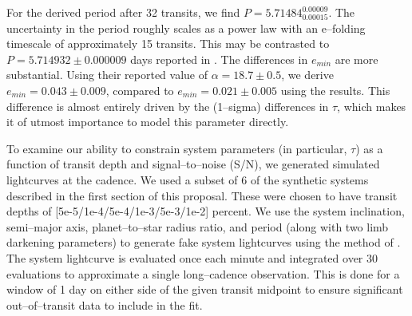For the derived period after 32 transits, we find $P =
5.71484_{0.00015}^{0.00009}$.  The uncertainty in the period roughly
scales as a power law with an e--folding timescale of approximately 15
transits.  This may be contrasted to $P = 5.714932 \pm 0.000009$ days
reported in \cite{2013arXiv1304.7387B}.  The differences in $e_{min}$
are more substantial.  Using their reported value of $\alpha =
18.7 \pm 0.5$, we derive $e_{min} = 0.043 \pm 0.009$, compared to
$e_{min} = 0.021 \pm 0.005$ using the \cite{2013arXiv1304.7387B}
results.  This difference is almost entirely driven by the (1--sigma)
differences in $\tau$, which makes it of utmost importance to model
this parameter directly.


\medskip
{\centerline{}}
\smallskip

To examine our ability to constrain system parameters (in
particular, $\tau$) as a function of transit depth and
signal--to--noise (S/N), we generated simulated lightcurves at
the \kepler cadence.  We used a subset of 6 of the synthetic systems
described in the first section of this proposal.  These were chosen to
have transit depths of [5e-5/1e-4/5e-4/1e-3/5e-3/1e-2] percent.  We
use the system inclination, semi--major axis, planet--to--star radius
ratio, and period (along with two limb darkening parameters) to
generate fake system lightcurves using the method of
\cite{2002ApJ...580L.171M}.  The system lightcurve is evaluated once
each minute and integrated over 30 evaluations to approximate a single
\kepler long--cadence observation.  This is done for a window of 1 day
on either side of the given transit midpoint to ensure significant
out--of--transit data to include in the fit.

